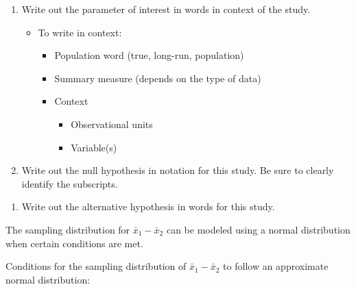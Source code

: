 \documentclass[
]{report}
\providecommand{\tightlist}{%
  \setlength{\itemsep}{0pt}\setlength{\parskip}{0pt}}
\begin{document}
\begin{enumerate}
\def\labelenumi{\arabic{enumi}.}
\item
  Write out the parameter of interest in words in context of the study.

  \begin{itemize}
  \item
    To write in context:

    \begin{itemize}
    \item
      Population word (true, long-run, population)
    \item
      Summary measure (depends on the type of data)
    \item
      Context

      \begin{itemize}
      \item
        Observational units
      \item
        Variable(s)
        \vspace{1in}
      \end{itemize}
    \end{itemize}
  \end{itemize}
\item
  Write out the null hypothesis in notation for this study. Be sure to clearly identify the subscripts.
\end{enumerate}

\vspace{0.4in}

\begin{enumerate}
\def\labelenumi{\arabic{enumi}.}
\setcounter{enumi}{2}
\tightlist
\item
  Write out the alternative hypothesis in words for this study.
\end{enumerate}

\vspace{0.8in}

The sampling distribution for \(\bar{x}_1-\bar{x}_2\) can be modeled using a normal distribution when certain conditions are met.

Conditions for the sampling distribution of \(\bar{x}_1-\bar{x}_2\) to follow an approximate normal distribution:
\end{document}
